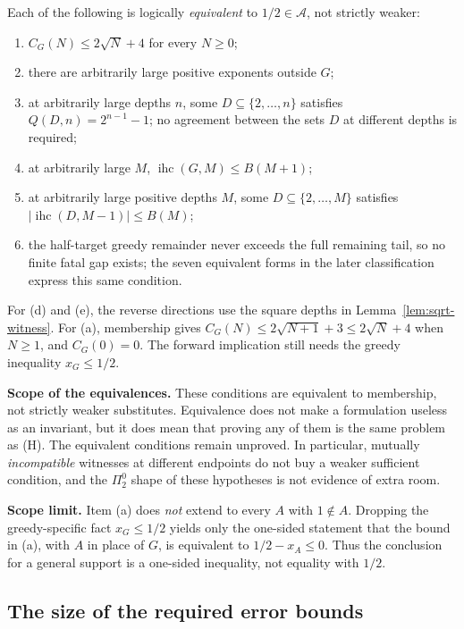 \begin{prop}
\label{prop:collapsed-list}
Each of the following is logically \emph{equivalent} to $1/2 \in \mathcal{A}$, not strictly weaker:
\begin{enumerate}[nosep,label=(\alph*)]
\item $C_G(N)\le2\sqrt N+4$ for every $N\ge0$;
\item there are arbitrarily large positive exponents outside $G$;
\item at arbitrarily large depths $n$, some $D\subseteq\{2,\ldots,n\}$
  satisfies $Q(D,n)=2^{n-1}-1$;
  no agreement between the sets $D$ at different depths is required;
\item at arbitrarily large $M$,
  $\operatorname{ihc}(G,M)\le B(M+1)$;
\item at arbitrarily large positive depths $M$, some
  $D\subseteq\{2,\ldots,M\}$ satisfies
  $|\operatorname{ihc}(D,M-1)|\le B(M)$;
\item the half-target greedy remainder never exceeds the full remaining
  tail, so no finite fatal gap exists; the seven equivalent
  forms in the later classification express this same condition.
\end{enumerate}
For (d) and (e), the reverse directions use the square depths in
Lemma~\ref{lem:sqrt-witness}.
For (a), membership gives
$C_G(N)\le2\sqrt{N+1}+3\le2\sqrt N+4$ when $N\ge1$, and $C_G(0)=0$.
The forward implication still needs the greedy inequality $x_G\le1/2$.
\end{prop}

\textbf{Scope of the equivalences.} These conditions are equivalent to membership, not strictly
weaker substitutes. Equivalence does not make a formulation useless as an invariant, but it does
mean that proving any of them is the same problem as (H). The equivalent conditions remain
unproved. In particular, mutually \emph{incompatible} witnesses at different endpoints do not buy
a weaker sufficient condition, and the $\Pi^0_2$ shape of these hypotheses is not evidence of extra
room.

\textbf{Scope limit.} Item (a) does \emph{not} extend to every $A$ with
$1 \notin A$. Dropping the greedy-specific fact $x_G \le 1/2$ yields only the one-sided statement
that the bound in (a), with $A$ in place of $G$, is equivalent to $1/2 - x_A \le 0$. Thus the conclusion for a general support is a one-sided inequality,
not equality with $1/2$.

\subsection{The size of the required error bounds}
\label{bar:scale}

